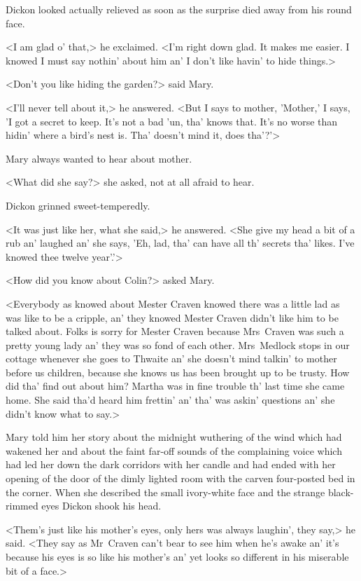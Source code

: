 Dickon looked actually relieved as soon as the surprise died away from his round face.

<I am glad o' that,> he exclaimed. <I'm right down glad. It makes me easier. I knowed I must say nothin' about him an' I don't like havin' to hide things.>

<Don't you like hiding the garden?> said Mary.

<I'll never tell about it,> he answered. <But I says to mother, 'Mother,' I says, 'I got a secret to keep. It's not a bad 'un, tha' knows that. It's no worse than hidin' where a bird's nest is. Tha' doesn't mind it, does tha'?'>

Mary always wanted to hear about mother.

<What did she say?> she asked, not at all afraid to hear.

Dickon grinned sweet-temperedly.

<It was just like her, what she said,> he answered. <She give my head a bit of a rub an' laughed an' she says, 'Eh, lad, tha' can have all th' secrets tha' likes. I've knowed thee twelve year'.'>

<How did you know about Colin?> asked Mary.

<Everybody as knowed about Mester Craven knowed there was a little lad as was like to be a cripple, an' they knowed Mester Craven didn't like him to be talked about. Folks is sorry for Mester Craven because Mrs~Craven was such a pretty young lady an' they was so fond of each other. Mrs~Medlock stops in our cottage whenever she goes to Thwaite an' she doesn't mind talkin' to mother before us children, because she knows us has been brought up to be trusty. How did tha' find out about him? Martha was in fine trouble th' last time she came home. She said tha'd heard him frettin' an' tha' was askin' questions an' she didn't know what to say.>

Mary told him her story about the midnight wuthering of the wind which had wakened her and about the faint far-off sounds of the complaining voice which had led her down the dark corridors with her candle and had ended with her opening of the door of the dimly lighted room with the carven four-posted bed in the corner. When she described the small ivory-white face and the strange black-rimmed eyes Dickon shook his head.

<Them's just like his mother's eyes, only hers was always laughin', they say,> he said. <They say as Mr~Craven can't bear to see him when he's awake an' it's because his eyes is so like his mother's an' yet looks so different in his miserable bit of a face.>

